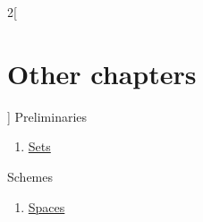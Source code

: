 \begin{multicols}{2}[\section{Other chapters}]
\noindent
Preliminaries
\begin{enumerate}
\item \hyperref[sets-section-phantom]{Sets}
\end{enumerate}
Schemes
\begin{enumerate}
\item \hyperref[spaces-section-phantom]{Spaces}
\end{enumerate}
\end{multicols}
